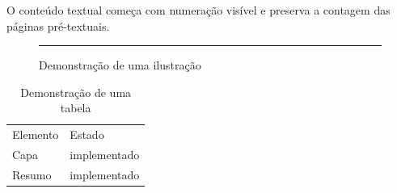 \documentclass[12pt]{article}
\begin{document}
O conteúdo textual começa com numeração visível e preserva a contagem das
páginas pré-textuais.

\begin{figure}[ht]
  \centering
  \rule{0.6\linewidth}{2cm}
  \caption{Demonstração de uma ilustração}
\end{figure}

\begin{table}[ht]
  \centering
  \caption{Demonstração de uma tabela}
  \begin{tabular}{ll}
    Elemento & Estado\\
    Capa & implementado\\
    Resumo & implementado
  \end{tabular}
\end{table}
\end{document}

